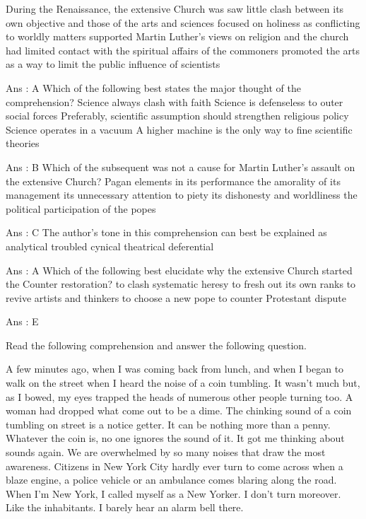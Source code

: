         During the Renaissance, the extensive Church was
            saw little clash between its own objective and those of the arts and sciences
            focused on holiness as conflicting to worldly matters
            supported Martin Luther’s views on religion and the church
            had limited contact with the spiritual affairs of the commoners
            promoted the arts as a way to limit the public influence of scientists 

        Ans : A
        Which of the following best states the major thought of the comprehension?
            Science always clash with faith
            Science is defenseless to outer social forces
            Preferably, scientific assumption should strengthen religious policy
            Science operates in a vacuum
            A higher machine is the only way to fine scientific theories 

        Ans : B
        Which of the subsequent was not a cause for Martin Luther’s assault on the extensive Church?
            Pagan elements in its performance
            the amorality of its management
            its unnecessary attention to piety
            its dishonesty and worldliness
            the political participation of the popes 

        Ans : C
        The author’s tone in this comprehension can best be explained as
            analytical
            troubled
            cynical
            theatrical
            deferential 

        Ans : A
        Which of the following best elucidate why the extensive Church started the Counter restoration?
            to clash systematic heresy
            to fresh out its own ranks
            to revive artists and thinkers
            to choose a new pope
            to counter Protestant dispute 

        Ans : E 




Read the following comprehension and answer the following question.

    A few minutes ago, when I was coming back from lunch, and when I began to walk on the street when I heard the noise of a coin tumbling. It wasn't much but, as I bowed, my eyes trapped the heads of numerous other people turning too. A woman had dropped what come out to be a dime. The chinking sound of a coin tumbling on street is a notice getter. It can be nothing more than a penny. Whatever the coin is, no one ignores the sound of it. It got me thinking about sounds again. We are overwhelmed by so many noises that draw the most awareness. Citizens in New York City hardly ever turn to come across when a blaze engine, a police vehicle or an ambulance comes blaring along the road. When I’m New York, I called myself as a New Yorker. I don't turn moreover. Like the inhabitants. I barely hear an alarm bell there.


